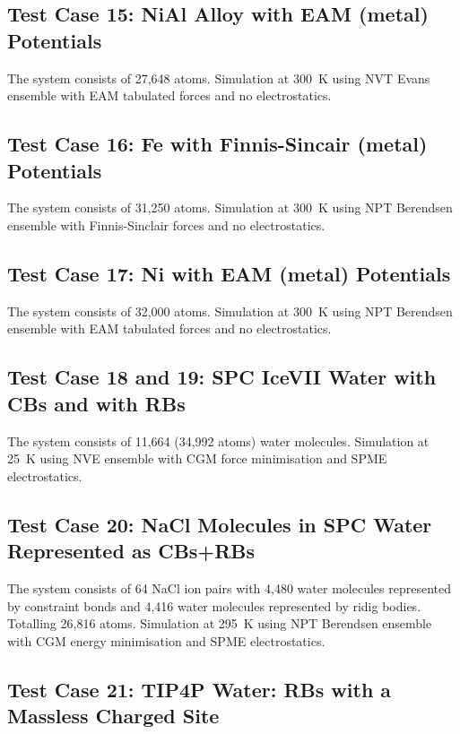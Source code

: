 \subsection{Test Case 15: NiAl Alloy with EAM (metal) Potentials}

The system consists of 27,648 atoms.  Simulation at 300~K using NVT
Evans ensemble with EAM tabulated forces and no electrostatics.

\subsection{Test Case 16: Fe with Finnis-Sincair (metal) Potentials}

The system consists of 31,250 atoms.  Simulation at 300~K using NPT
Berendsen ensemble with Finnis-Sinclair forces and no electrostatics.

\subsection{Test Case 17: Ni with EAM (metal) Potentials}

The system consists of 32,000 atoms.  Simulation at 300~K using NPT
Berendsen ensemble with EAM tabulated forces and no electrostatics.

\subsection{Test Case 18 and 19: SPC IceVII Water with CBs and with RBs}

The system consists of 11,664 (34,992 atoms) water molecules. Simulation
at 25~K using NVE ensemble with CGM force minimisation and SPME electrostatics.

\subsection{Test Case 20: NaCl Molecules in SPC Water Represented as CBs+RBs}

The system consists of 64 NaCl ion pairs with 4,480 water molecules
represented by constraint bonds and 4,416 water molecules represented
by ridig bodies.  Totalling 26,816 atoms.  Simulation at 295~K using NPT
Berendsen ensemble with CGM energy minimisation and SPME electrostatics.

\subsection{Test Case 21: TIP4P Water: RBs with a Massless Charged Site}

